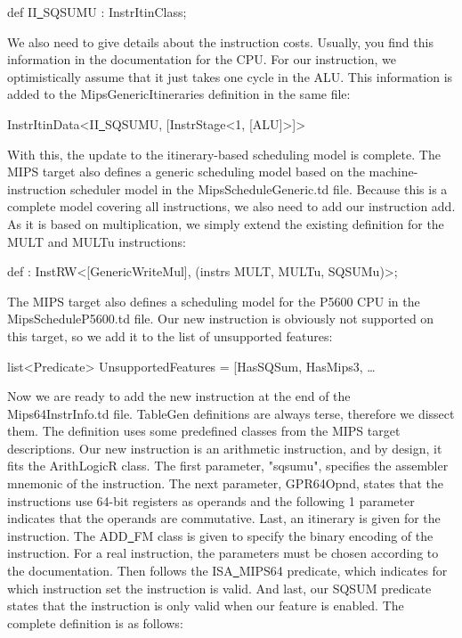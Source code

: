 \begin{tcolorbox}[colback=white,colframe=black]
def II\underline{~}SQSUMU : InstrItinClass;
\end{tcolorbox}

We also need to give details about the instruction costs. Usually, you find this information in the documentation for the CPU. For our instruction, we optimistically assume that it just takes one cycle in the ALU. This information is added to the MipsGenericItineraries definition in the same file:\par

\begin{tcolorbox}[colback=white,colframe=black]
InstrItinData<II\underline{~}SQSUMU, [InstrStage<1, [ALU]>]>
\end{tcolorbox}

With this, the update to the itinerary-based scheduling model is complete. The MIPS target also defines a generic scheduling model based on the machine-instruction scheduler model in the MipsScheduleGeneric.td file. Because this is a complete model covering all instructions, we also need to add our instruction add. As it is based on multiplication, we simply extend the existing definition for the MULT and MULTu instructions:\par

\begin{tcolorbox}[colback=white,colframe=black]
def : InstRW<[GenericWriteMul], (instrs MULT, MULTu, SQSUMu)>;
\end{tcolorbox}

The MIPS target also defines a scheduling model for the P5600 CPU in the MipsScheduleP5600.td file. Our new instruction is obviously not supported on this target, so we add it to the list of unsupported features:\par

\begin{tcolorbox}[colback=white,colframe=black]
list<Predicate> UnsupportedFeatures = [HasSQSum, HasMips3, … 
\end{tcolorbox}

Now we are ready to add the new instruction at the end of the Mips64InstrInfo.td file. TableGen definitions are always terse, therefore we dissect them. The definition uses some predefined classes from the MIPS target descriptions. Our new instruction is an arithmetic instruction, and by design, it fits the ArithLogicR class. The first parameter, "sqsumu", specifies the assembler mnemonic of the instruction. The next parameter, GPR64Opnd, states that the instructions use 64-bit registers as operands and the following 1 parameter indicates that the operands are commutative. Last, an itinerary is given for the instruction. The ADD\underline{~}FM class is given to specify the binary encoding of the instruction. For a real instruction, the parameters must be chosen according to the documentation. Then follows the ISA\underline{~}MIPS64 predicate, which indicates for which instruction set the instruction is valid. And last, our SQSUM predicate states that the instruction is only valid when our feature is enabled. The complete definition is as follows:\par

